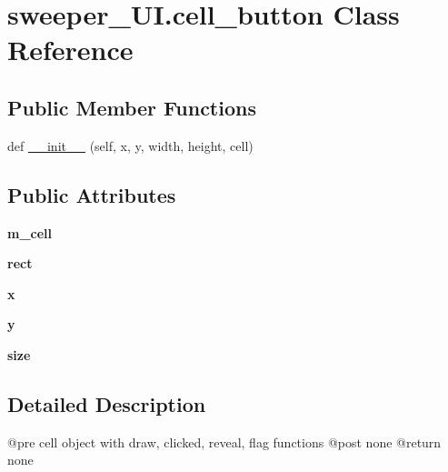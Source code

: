 \hypertarget{classsweeper___u_i_1_1cell__button}{}\section{sweeper\+\_\+\+U\+I.\+cell\+\_\+button Class Reference}
\label{classsweeper___u_i_1_1cell__button}
\subsection*{Public Member Functions}
\begin{DoxyCompactItemize}
\item 
def \hyperlink{classsweeper___u_i_1_1cell__button_a331ff79c7f93f68d677c7b6aaafbc23a}{\+\_\+\+\_\+init\+\_\+\+\_\+} (self, x, y, width, height, cell)
\end{DoxyCompactItemize}
\subsection*{Public Attributes}
\begin{DoxyCompactItemize}
\item 
\mbox{\label{classsweeper___u_i_1_1cell__button_aeec9de7b86691855cbf3f7ca4e35e2bb}} 
{\bfseries m\+\_\+cell}
\item 
\mbox{\label{classsweeper___u_i_1_1cell__button_a70b060c327eb8b214d9cd70c40260d98}} 
{\bfseries rect}
\item 
\mbox{\label{classsweeper___u_i_1_1cell__button_a6acbd87cea0972e28cf86366579af805}} 
{\bfseries x}
\item 
\mbox{\label{classsweeper___u_i_1_1cell__button_aa14681a2e65b5acf370043ced5e4115a}} 
{\bfseries y}
\item 
\mbox{\label{classsweeper___u_i_1_1cell__button_a9b3dd9fed2a556108c300305a271da8b}} 
{\bfseries size}
\end{DoxyCompactItemize}


\subsection{Detailed Description}
\begin{DoxyVerb}@pre cell object with draw, clicked, reveal, flag functions
@post none
@return none
\end{DoxyVerb}
 

